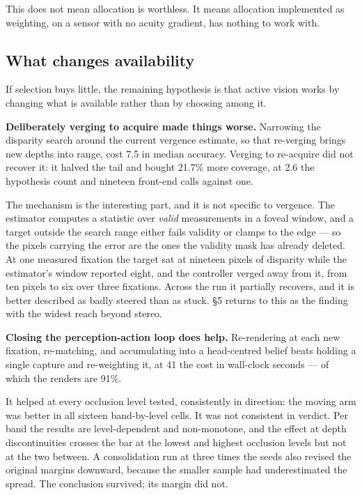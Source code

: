 This does not mean allocation is worthless. It means allocation implemented as
weighting, on a sensor with no acuity gradient, has nothing to work with.

\subsection{What changes availability}

If selection buys little, the remaining hypothesis is that active vision works
by changing what is available rather than by choosing among it.

\textbf{Deliberately verging to acquire made things worse.} Narrowing the
disparity search around the current vergence estimate, so that re-verging brings
new depths into range, cost 7.5\texttimes{} in median accuracy. Verging to
re-acquire did not recover it: it halved the tail and bought 21.7\% more
coverage, at 2.6\texttimes{} the hypothesis count and nineteen front-end calls
against one.

The mechanism is the interesting part, and it is not specific to vergence. The
estimator computes a statistic over \emph{valid} measurements in a foveal
window, and a target outside the search range either fails validity or clamps to
the edge --- so the pixels carrying the error are the ones the validity mask has
already deleted. At one measured fixation the target sat at nineteen pixels of
disparity while the estimator's window reported eight, and the controller verged
away from it, from ten pixels to six over three fixations. Across the run it
partially recovers, and it is better described as badly steered than as stuck.
\S5 returns to this as the finding with the widest reach beyond stereo.

\textbf{Closing the perception-action loop does help.} Re-rendering at each new
fixation, re-matching, and accumulating into a head-centred belief beats holding
a single capture and re-weighting it, at 41\texttimes{} the cost in wall-clock
seconds --- of which the renders are 91\%.

It helped at every occlusion level tested, consistently in direction: the moving
arm was better in all sixteen band-by-level cells. It was not consistent in
verdict. Per band the results are level-dependent and non-monotone, and the
effect at depth discontinuities crosses the bar at the lowest and highest
occlusion levels but not at the two between. A consolidation run at three times
the seeds also revised the original margins downward, because the smaller sample
had underestimated the spread. The conclusion survived; its margin did not.


